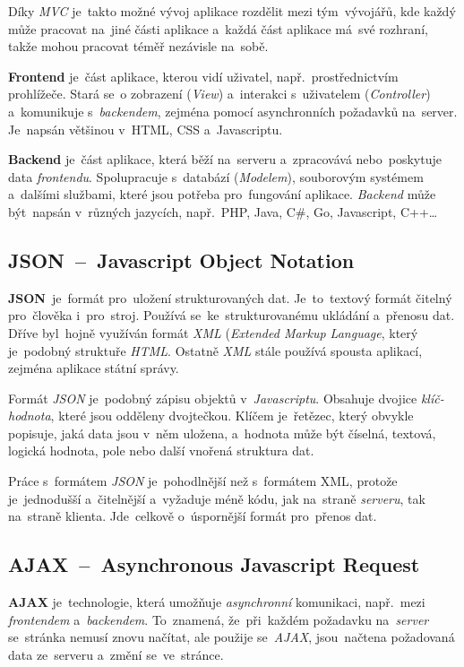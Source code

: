 \documentclass[10pt,a4paper]{article}
\begin{document}
            Díky \emph{MVC} je~takto možné vývoj aplikace rozdělit mezi tým~vývojářů, kde každý může pracovat na~jiné části aplikace a~každá část aplikace má~své rozhraní, takže mohou pracovat téměř nezávisle na~sobě.

            \textbf{Frontend} je~část aplikace, kterou vidí uživatel, např.~prostřednictvím prohlížeče. Stará se~o zobrazení (\emph{View}) a~interakci s~uživatelem (\emph{Controller}) a~komunikuje s~\emph{backendem}, zejména pomocí asynchronních požadavků na~server. Je~napsán většinou v~HTML, CSS a~Javascriptu.

            \textbf{Backend} je~část aplikace, která běží na~serveru a~zpracovává nebo~poskytuje data \emph{frontendu}. Spolupracuje s~databází (\emph{Modelem}), souborovým systémem a~dalšími službami, které jsou potřeba pro~fungování aplikace. \emph{Backend} může být~napsán v~různých jazycích, např.~PHP, Java, C\#, Go, Javascript, C++\dots

        \subsection{JSON~--~Javascript Object Notation}
            \textbf{JSON}~je~formát pro~uložení strukturovaných dat. Je~to~textový formát čitelný pro~člověka i~pro~stroj. Používá se~ke~strukturovanému ukládání a~přenosu dat. Dříve byl~hojně využíván formát \emph{XML} (\emph{Extended Markup Language}, který je~podobný struktuře \emph{HTML}. Ostatně \emph{XML} stále používá spousta aplikací, zejména aplikace státní správy.

            Formát \emph{JSON} je~podobný zápisu objektů v~\emph{Javascriptu}. Obsahuje dvojice \emph{klíč-hodnota}, které jsou odděleny dvojtečkou. Klíčem je~řetězec, který obvykle popisuje, jaká data jsou v~něm uložena, a~hodnota může být číselná, textová, logická hodnota, pole nebo další vnořená struktura dat.
            
            Práce s~formátem \emph{JSON} je~pohodlnější než s~formátem XML, protože je~jednodušší a~čitelnější a~vyžaduje méně kódu, jak na~straně \emph{serveru}, tak na~straně klienta. Jde~celkově o~úspornější formát pro~přenos dat.

        \subsection{AJAX~--~Asynchronous Javascript Request}
            \textbf{AJAX} je~technologie, která umožňuje \emph{asynchronní} komunikaci, např.~mezi \emph{frontendem} a~\emph{backendem}. To~znamená, že~při~každém požadavku na~\emph{server} se~stránka nemusí znovu načítat, ale použije se~\emph{AJAX}, jsou~načtena požadovaná data ze~serveru a~změní se~ve~stránce.
\end{document}
